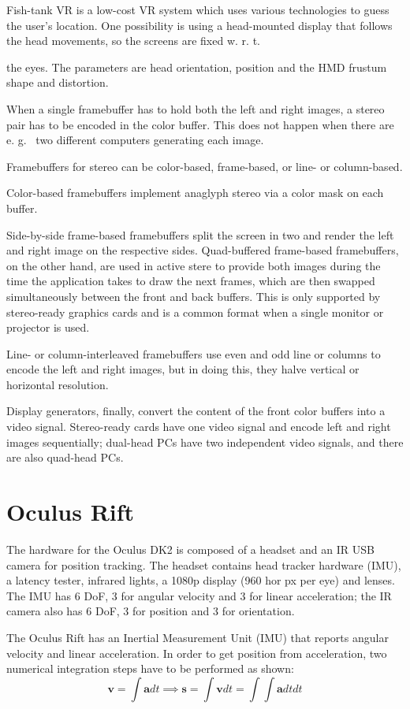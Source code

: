\documentclass[a4paper]{article}
\begin{document}
Fish-tank VR is a low-cost VR system which uses various technologies to
guess the user's location.
One possibility is using a head-mounted
display that follows the head movements, so the screens are fixed w.
r.
t.

the eyes.
The parameters are head orientation, position and the HMD
frustum shape and distortion.

When a single framebuffer has to hold both the left and right images, a
stereo pair has to be encoded in the color buffer.
This does not happen
when there are e.
g.
~two different computers generating each image.

Framebuffers for stereo can be color-based, frame-based, or line- or
column-based.

Color-based framebuffers implement anaglyph stereo via a color mask on
each buffer.

Side-by-side frame-based framebuffers split the screen in two and render
the left and right image on the respective sides.
Quad-buffered
frame-based framebuffers, on the other hand, are used in active stere to
provide both images during the time the application takes to draw the
next frames, which are then swapped simultaneously between the front and
back buffers.
This is only supported by stereo-ready graphics cards and
is a common format when a single monitor or projector is used.

Line- or column-interleaved framebuffers use even and odd line or
columns to encode the left and right images, but in doing this, they
halve vertical or horizontal resolution.

Display generators, finally, convert the content of the front color
buffers into a video signal.
Stereo-ready cards have one video signal
and encode left and right images sequentially; dual-head PCs have two
independent video signals, and there are also quad-head PCs.

\section{Oculus Rift}

The hardware for the Oculus DK2 is composed of a headset and an IR USB
camera for position tracking.
The headset contains head tracker hardware
(IMU), a latency tester, infrared lights, a 1080p display (960 hor px
per eye) and lenses.
The IMU has 6 DoF, 3 for angular velocity and 3 for
linear acceleration; the IR camera also has 6 DoF, 3 for position and 3
for orientation.

The Oculus Rift has an Inertial Measurement Unit (IMU) that reports
angular velocity and linear acceleration.
In order to get position from
acceleration, two numerical integration steps have to be performed as
shown: \[
\mathbf{v} = \int \mathbf{a} dt \implies \mathbf{s} = \int \mathbf{v} dt = \int \int \mathbf{a} dt dt
\]
\end{document}

